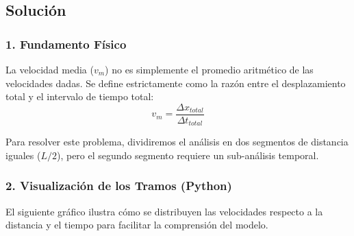 \documentclass[12pt, a4paper]{article}
\begin{document}
\begin{center}
\end{center}

\subsection*{Solución}

\subsubsection*{1. Fundamento Físico}

La velocidad media ($v_m$) no es simplemente el promedio aritmético de las velocidades dadas. Se define estrictamente como la razón entre el desplazamiento total y el intervalo de tiempo total:
\begin{equation}
    v_m = \frac{\Delta x_{total}}{\Delta t_{total}}
\end{equation}

Para resolver este problema, dividiremos el análisis en dos segmentos de distancia iguales ($L/2$), pero el segundo segmento requiere un sub-análisis temporal.

\subsubsection*{2. Visualización de los Tramos (Python)}

El siguiente gráfico ilustra cómo se distribuyen las velocidades respecto a la distancia y el tiempo para facilitar la comprensión del modelo.
\end{document}
